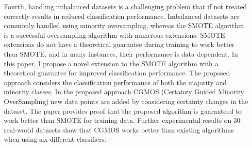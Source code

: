 \documentclass{iitthesis}
\begin{document}
Fourth, handling imbalanced datasets is a challenging problem that if not treated correctly results in reduced classification performance. Imbalanced datasets are commonly handled using minority oversampling, whereas the SMOTE algorithm is a successful oversampling algorithm with numerous extensions. SMOTE extensions do not have a theoretical guarantee during training to work better than SMOTE, and in many instances, their performance is data dependent. In this paper, I propose a novel extension to the SMOTE algorithm with a theoretical guarantee for improved classification performance. The proposed approach considers the classification performance of both the majority and
minority classes. In the proposed approach CGMOS (Certainty Guided Minority OverSampling) new data points are added by considering certainty changes in the dataset. The paper provides proof that the proposed algorithm is guaranteed to work better than SMOTE for training data. Further experimental results on 30 real-world datasets show
that CGMOS works better than existing algorithms when using six different classifiers.
\clearpage


%
%
%
%
%
%
%
%
%


 

\end{document}
